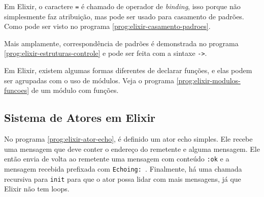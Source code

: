 \begin{program}
  
  \caption{Estruturas de Dados em Elixir.\label{prog:elixir-estruturas-dados}}
\end{program}

Em Elixir, o caractere \texttt{=} é chamado de operador de \emph{binding}, isso porque não simplesmente faz atribuição, mas pode ser usado para casamento de padrões. Como pode ser visto no programa \ref{prog:elixir-casamento-padroes}.

\begin{program}
  
  \caption{Casamento de Padrões em Elixir.\label{prog:elixir-casamento-padroes}}
\end{program}

Mais amplamente, correspondência de padrões é demonstrada no programa \ref{prog:elixir-estruturas-controle} e pode ser feita com a sintaxe \texttt{->}.

\begin{program}
  
  \caption{Estruturas de Controle em Elixir.\label{prog:elixir-estruturas-controle}}
\end{program}

Em Elixir, existem algumas formas diferentes de declarar funções, e elas podem ser agrupadas com o uso de módulos. Veja o programa \ref{prog:elixir-modulos-funcoes} de um módulo com funções.

\begin{program}
  
  \caption{Módulos e Funções em Elixir.\label{prog:elixir-modulos-funcoes}}
\end{program}

\subsection{Sistema de Atores em Elixir}
\begin{program}
  
  \caption{Exemplo de Ator Echo em Elixir.\label{prog:elixir-ator-echo}}
\end{program}

No programa \ref{prog:elixir-ator-echo},
é definido um ator echo simples. Ele recebe uma mensagem que deve conter o endereço do remetente e alguma mensagem. Ele então envia de volta ao remetente uma mensagem com conteúdo \texttt{:ok} e a mensagem recebida prefixada com \texttt{Echoing: }. Finalmente, há uma chamada recursiva para \texttt{init} para que o ator possa lidar com mais mensagens, já que Elixir não tem loops.

